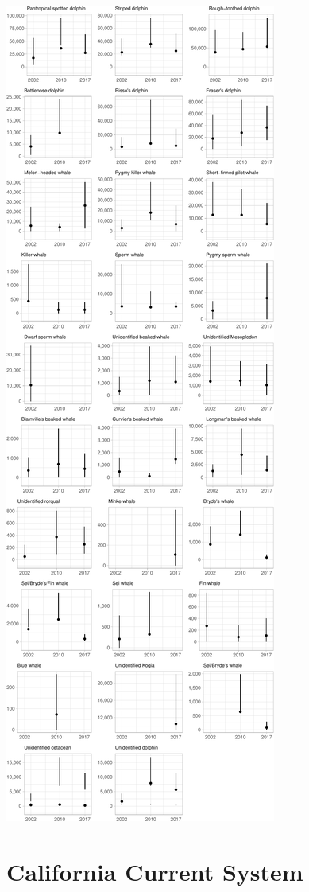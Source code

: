 \documentclass[
]{book}
\begin{document}
\includegraphics{figures/unnamed-chunk-366-1.pdf}

\hypertarget{california-current-system}{%
\chapter{California Current System}\label{california-current-system}}
\end{document}
